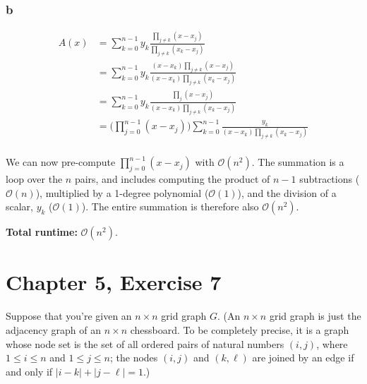 \documentclass[12pt, letterpaper]{article}
\begin{document}
\subsubsection*{b}

\begin{align*}
    A(x) &= \sum_{k=0}^{n-1}{y_k\frac{ \prod_{j \neq k}{(x - x_j)} }{ \prod_{j \neq k}{(x_k - x_j)} }} \\
         &= \sum_{k=0}^{n-1}{y_k\frac{ (x - x_k) \prod_{j \neq k}{(x - x_j)} }{ (x - x_k) \prod_{j \neq k}{(x_k - x_j)} }} \\
         &= \sum_{k=0}^{n-1}{y_k\frac{ \prod_{j}{(x - x_j)} }{ (x - x_k) \prod_{j \neq k}{(x_k - x_j)} }} \\
         &= \big( \prod_{j=0}^{n-1}{(x - x_j)} \big) \sum_{k=0}^{n-1}{\frac{ y_k }{ (x - x_k) \prod_{j \neq k}{(x_k - x_j)} }} \\
\end{align*}

We can now pre-compute $\prod_{j=0}^{n-1}{(x - x_j)}$ with $\mathcal{O}(n^2)$.
The summation is a loop over the $n$ pairs, and includes computing the product of $n - 1$ subtractions ($\mathcal{O}(n)$), multiplied by a 1-degree polynomial ($\mathcal{O}(1)$), and the division of a scalar, $y_k$ ($\mathcal{O}(1)$).
The entire summation is therefore also  $\mathcal{O}(n^2)$.

\vspace{5mm}
\noindent\textbf{Total runtime:}  $\mathcal{O}(n^2)$.



\clearpage
\section{Chapter 5, Exercise 7}
Suppose that you're given an $n \times n$ grid graph $G$.
(An $n \times n$ grid graph is just the adjacency graph of an $n \times n$ chessboard. 
To be completely precise, it is a graph whose node set is the set of all ordered pairs of
natural numbers $(i, j)$, where $1 \leq i \leq n$ and $1 \leq j \leq n$; the nodes $(i, j)$ and $(k, \ell)$ are joined by an edge if and only if $|i - k| + |j - \ell| = 1$.)
\end{document}
